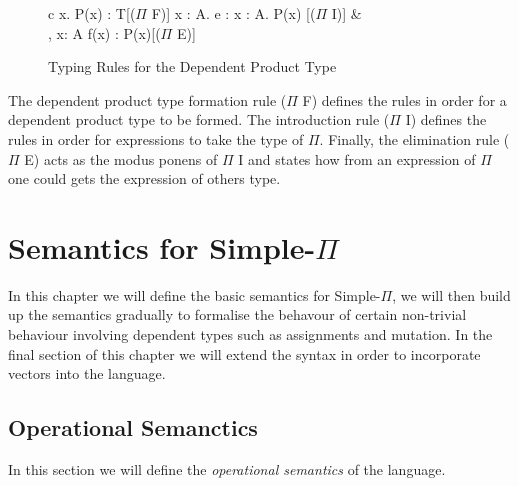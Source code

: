 \documentclass[a4paper,12pt]{report}
\begin{document}
\begin{figure}[H]
  \begin{center}
    \begin{tabular} {c}
        {\Gamma \vdash \Pi x. P(x) : T}[($\Pi$ F)] \text{ }
        {\Gamma \vdash \lambda x : A. e : \Pi x : A. P(x) }[($\Pi$ I)] & \\
        {\Gamma, x: A \vdash f(x) : P(x)}[($\Pi$ E)] \text{ }
    \end{tabular}
  \end{center}
  \caption{Typing Rules for the Dependent Product Type}
\end{figure}

\par
The dependent product type formation rule ($\Pi$ F) defines the rules in order 
for a dependent product type to be formed. The introduction rule ($\Pi$ I) 
defines the rules in order for expressions to take the type of $\Pi$. Finally, 
the elimination rule ($\Pi$ E) acts as the modus ponens of $\Pi$ I and states 
how from an expression of $\Pi$ one could gets the expression of others type. 


\chapter{Semantics for Simple-$\Pi$}
In this chapter we will define the basic semantics for Simple-$\Pi$, we will 
then build up the semantics gradually to formalise the behavour of certain 
non-trivial behaviour involving dependent types such as assignments and 
mutation. In the final section of this chapter we will extend the syntax in 
order to incorporate vectors into the language.

\section{Operational Semanctics}
In this section we will define the \textit{operational semantics} 
\cite{operationalSemantics} of the language.
\end{document}
